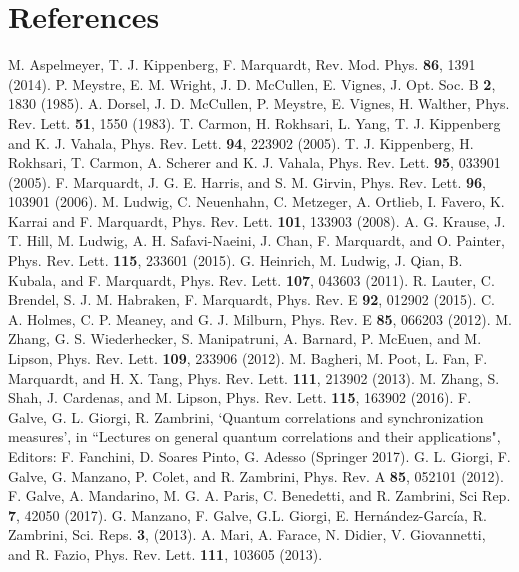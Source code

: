 \documentclass[a4paper]{jpconf}
\begin{document}
\section*{References}
\begin{thebibliography}{99}
 M. Aspelmeyer, T. J. Kippenberg, F. Marquardt, Rev. Mod. Phys. 
\textbf{86}, 1391 (2014).
 P. Meystre, E. M. Wright, J. D. McCullen, E. Vignes, J. Opt. Soc. B 
\textbf{2}, 1830 (1985).
 A. Dorsel, J. D. McCullen, P. Meystre, E. Vignes, H. Walther, Phys. 
Rev. Lett. \textbf{51}, 1550 (1983).
 T. Carmon, H. Rokhsari, L. Yang, T. J. Kippenberg and K. J. Vahala, 
Phys. Rev. Lett. \textbf{94}, 223902 (2005).
 T. J. Kippenberg, H. Rokhsari, T. Carmon, A. Scherer and K. J. Vahala, 
Phys. Rev. Lett. \textbf{95}, 033901 (2005).
 F. Marquardt, J. G. E. Harris, and S. M. Girvin, Phys. Rev. Lett. 
\textbf{96}, 103901 (2006).
 M. Ludwig, C. Neuenhahn, C. Metzeger, A. Ortlieb, I. Favero, K. 
Karrai and F. Marquardt, Phys. Rev. Lett. \textbf{101}, 133903 (2008).
 A. G. Krause, J. T. Hill, M. Ludwig, A. H. Safavi-Naeini, J. Chan, F. 
Marquardt, and O. Painter, Phys. Rev. Lett. \textbf{115}, 233601 (2015).
 G. Heinrich, M. Ludwig, J. Qian, B. Kubala, and F. Marquardt, Phys. 
Rev. Lett. \textbf{107}, 043603 (2011).
 R. Lauter, C. Brendel, S. J. M. Habraken, F. Marquardt, Phys. Rev. E 
\textbf{92}, 012902 (2015).
 C. A. Holmes, C. P. Meaney, and G. J. Milburn, Phys. Rev. E 
\textbf{85}, 066203 (2012).
 M. Zhang, G. S. Wiederhecker, S. Manipatruni, A. Barnard, P. McEuen, 
and M. Lipson, Phys. Rev. Lett. \textbf{109}, 233906 (2012).
 M. Bagheri, M. Poot, L. Fan, F. Marquardt, and H. X. Tang, Phys. 
Rev. Lett. \textbf{111}, 213902 (2013).
 M. Zhang, S. Shah, J. Cardenas, and M. Lipson, Phys. Rev. Lett. 
\textbf{115}, 163902 (2016).
 F. Galve, G. L. Giorgi, R. Zambrini, `Quantum correlations and 
synchronization measures', in ``Lectures on general quantum correlations and their applications", Editors: F. Fanchini, D. Soares Pinto, G. Adesso
(Springer 2017).
 G. L. Giorgi, F. Galve, G. Manzano, P. Colet, and R. Zambrini, Phys. 
Rev. A \textbf{85}, 052101 (2012).
 F. Galve, A. Mandarino, M. G. A. Paris, C. Benedetti, and R. 
Zambrini, Sci Rep. \textbf{7}, 42050 (2017).
 G. Manzano, F. Galve, G.L. Giorgi, E. Hernández-García, R. Zambrini, Sci. Reps. \textbf{3}, (2013).
 A. Mari, A. Farace, N. Didier, V. Giovannetti, and R. Fazio, Phys. Rev. Lett. \textbf{111}, 103605 (2013).

\end{thebibliography}
\end{document}

